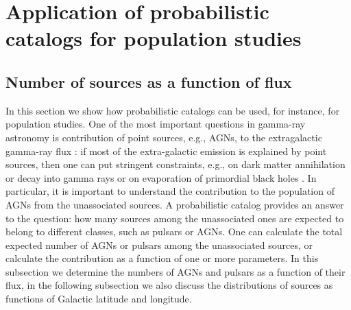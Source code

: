 \section{Application of probabilistic catalogs for population studies}

\subsection{Number of sources as a function of flux}


In this section we show how probabilistic catalogs can be used, for instance, for population studies.
One of the most important questions in gamma-ray astronomy is contribution of point sources, 
e.g., AGNs, to the extragalactic gamma-ray flux 
\citep[e.g.,][]{2010ApJ...720..435A, 2011ApJ...738..181M, 2016PhRvL.116o1105A, 2016ApJS..225...18Z, 2016ApJ...826L..31Z, 2016ApJ...832..117L, 2018ApJ...856..106D}:
if most of the extra-galactic emission is explained by point sources, then one can put stringent constraints, 
e.g., on  dark matter annihilation or decay into gamma rays 
\citep{2015ApJ...800L..27A, 2015PhRvD..91l3001D, 2015JCAP...09..008F, 2015PhR...598....1F, 2017ChPhC..41d5104L} or 
on evaporation of primordial black holes \citep{2010PhRvD..81j4019C}.
In particular, it is important to understand the contribution to the population of AGNs from the unassociated sources.
A probabilistic catalog provides an answer to the question: how many sources among the unassociated ones are expected to belong to different classes, such as pulsars or AGNs. 
One can calculate the total expected number of AGNs or pulsars among the unassociated sources, or calculate the contribution as a function of one or more parameters.
In this subsection we determine the numbers of AGNs and pulsars as a function of their flux, in the following subsection we also discuss the distributions of sources as functions
of Galactic latitude and longitude.



